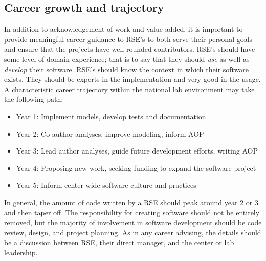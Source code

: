 \documentclass[]{nrel}
\begin{document}
\begin{appendices}
\section{Career growth and trajectory}
In addition to acknowledgement of work and value added, it is important to provide meaningful
career guidance to RSE's to both serve their personal goals and ensure
that the projects have well-rounded contributors. RSE's should have some level of domain
experience; that is to say that they should \textit{use} as well as \textit{develop} their software.
RSE's should know the context in which their software exists.
They should be experts in the implementation and very good in the usage.
A characteristic career trajectory within the national lab environment may take the following path:

\begin{itemize}
\item Year 1: Implement models, develop tests and documentation
\item Year 2: Co-author analyses, improve modeling, inform AOP
\item Year 3: Lead author analyses, guide future development efforts, writing AOP
\item Year 4: Proposing new work, seeking funding to expand the software project
\item Year 5: Inform center-wide software culture and practices
\end{itemize}

In general, the amount of code written by a RSE should peak around year 2 or 3 and
then taper off. The responsibility for creating software should not be entirely removed, but
the majority of involvement in software development should be code review, design, and
project planning. As in any career advising, the details should be a discussion between RSE, their
direct manager, and the center or lab leadership.


\end{appendices}
\end{document}
